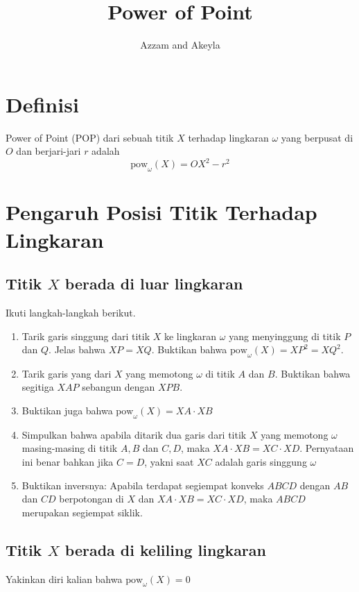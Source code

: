 \documentclass[11pt]{scrartcl}
\title{Power of Point}
\author{Azzam and Akeyla}
\begin{document}
\maketitle

\renewcommand*\contentsname{Daftar Isi}
\tableofcontents

\newpage

\section{Definisi}
Power of Point (POP) dari sebuah titik $X$ terhadap lingkaran $\omega$ yang berpusat di $O$ dan berjari-jari $r$ adalah \[\text{pow}_\omega(X) = OX^2 - r^2\]

\section{Pengaruh Posisi Titik Terhadap Lingkaran}
\subsection{Titik $X$ berada di luar lingkaran}
Ikuti langkah-langkah berikut.
\begin{enumerate}
    \item Tarik garis singgung dari titik $X$ ke lingkaran $\omega$ yang menyinggung di titik $P$ dan $Q$. Jelas bahwa $XP = XQ$. Buktikan bahwa $\text{pow}_\omega(X) = XP^2 = XQ^2$.
    \item Tarik garis yang dari $X$ yang memotong $\omega$ di titik $A$ dan $B$. Buktikan bahwa segitiga $XAP$ sebangun dengan $XPB$.
    \item Buktikan juga bahwa $\text{pow}_\omega(X) = XA\cdot XB$
    \item Simpulkan bahwa apabila ditarik dua garis dari titik $X$ yang memotong $\omega$ masing-masing di titik $A, B$ dan $C, D$, maka $XA\cdot XB = XC\cdot XD$. Pernyataan ini benar bahkan jika $C = D$, yakni saat $XC$ adalah garis singgung $\omega$
    \item Buktikan inversnya: Apabila terdapat segiempat konveks $ABCD$ dengan $AB$ dan $CD$ berpotongan di $X$ dan $XA\cdot XB = XC\cdot XD$, maka $ABCD$ merupakan segiempat siklik. 
\end{enumerate}
\subsection{Titik $X$ berada di keliling lingkaran}
Yakinkan diri kalian bahwa $\text{pow}_{\omega}(X) = 0$
\end{document}
